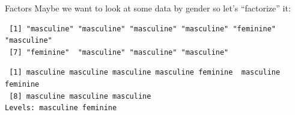 \documentclass[
  ignorenonframetext,
]{beamer}
\newenvironment{Shaded}{\begin{snugshade}}{\end{snugshade}}
\newcommand{\AttributeTok}[1]{\textcolor[rgb]{0.40,0.45,0.13}{#1}}
\newcommand{\CommentTok}[1]{\textcolor[rgb]{0.37,0.37,0.37}{#1}}
\newcommand{\DecValTok}[1]{\textcolor[rgb]{0.68,0.00,0.00}{#1}}
\newcommand{\FunctionTok}[1]{\textcolor[rgb]{0.28,0.35,0.67}{#1}}
\newcommand{\NormalTok}[1]{\textcolor[rgb]{0.00,0.23,0.31}{#1}}
\newcommand{\OtherTok}[1]{\textcolor[rgb]{0.00,0.23,0.31}{#1}}
\newcommand{\SpecialCharTok}[1]{\textcolor[rgb]{0.37,0.37,0.37}{#1}}
\newcommand{\StringTok}[1]{\textcolor[rgb]{0.13,0.47,0.30}{#1}}
\begin{document}
\begin{frame}[fragile]{Factors}
\protect\hypertarget{factors}{}
Maybe we want to look at some data by gender so let's ``factorize'' it:

\begin{Shaded}
\end{Shaded}

\begin{verbatim}
 [1] "masculine" "masculine" "masculine" "masculine" "feminine"  "masculine"
 [7] "feminine"  "masculine" "masculine" "masculine"
\end{verbatim}

\begin{Shaded}
\end{Shaded}

\begin{verbatim}
 [1] masculine masculine masculine masculine feminine  masculine feminine 
 [8] masculine masculine masculine
Levels: masculine feminine
\end{verbatim}
\end{frame}
\end{document}
